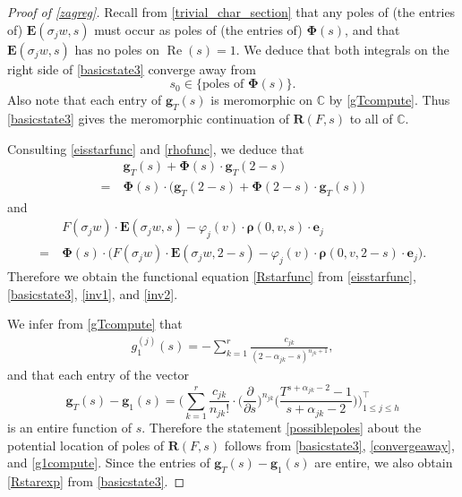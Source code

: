 \documentclass[12pt,reqno]{amsart}
\numberwithin{equation}{section}
\renewcommand{\Re}{\operatorname{Re}}
\begin{document}
\begin{proof}[Proof of \cref{zagreg}]
Recall from \cref{trivial_char_section} that any poles of (the entries of) $\boldsymbol{E}(\sigma_{j}w,s)$ must occur as poles of (the entries of) $\boldsymbol{\Phi}(s)$, and that $\boldsymbol{E}(\sigma_{j}w,s)$ has no poles on $\Re(s)=1$. We deduce that both integrals on the right side of \eqref{basicstate3} converge away from
\begin{equation}\label{convergeaway}
    s_0 \in \big\{\text{poles of } \boldsymbol{\Phi}(s)\big\}.
\end{equation} 
Also note that each entry of $\boldsymbol{g}_{T}(s)$ is meromorphic on $\mathbb{C}$ by  \eqref{gTcompute}. Thus \eqref{basicstate3} gives the meromorphic continuation of $\boldsymbol{R}(F,s)$ to all of $\mathbb{C}$.

Consulting \eqref{eisstarfunc} and \eqref{rhofunc}, we deduce that 
\begin{equation}\label{inv1}
\begin{aligned} 
    & \boldsymbol{g}_T(s)+ \boldsymbol{\Phi}(s) \cdot \boldsymbol{g}_T(2-s)   \\ 
    = \ & \boldsymbol{\Phi}(s) \cdot  \Big( \boldsymbol{g}_T(2-s) + \boldsymbol{\Phi}(2-s) \cdot \boldsymbol{g}_T(s) \Big)
\end{aligned}
\end{equation}
and 
\begin{equation}\label{inv2}
\begin{aligned} 
    & F(\sigma_{j} w) \cdot \boldsymbol{E}(\sigma_{j}w,s)-\varphi_{j}(v) \cdot \boldsymbol{\rho}(0,v,s) \cdot \boldsymbol{e}_j \\
    = \ & \boldsymbol{\Phi}(s) \cdot \Big(F(\sigma_{j} w) \cdot \boldsymbol{E}(\sigma_{j}w,2-s) -\varphi_{j}(v) \cdot \boldsymbol{\rho}(0,v,2-s) \cdot \boldsymbol{e}_j \Big).
\end{aligned}
\end{equation}
Therefore we obtain the functional equation \eqref{Rstarfunc} from \eqref{eisstarfunc}, \eqref{basicstate3}, \eqref{inv1}, and \eqref{inv2}.

We infer from \eqref{gTcompute} that 
\begin{align} \label{g1compute}
    g^{(j)}_1(s)=-\sum_{k=1}^{r} \frac{c_{jk}}{(2-\alpha_{jk}-s)^{n_{jk}+1}},
\end{align}
and that each entry of the vector
\begin{equation} \label{entire}
    \boldsymbol{g}_{T}(s)-\boldsymbol{g}_{1}(s)= \Big( \sum_{k=1}^{r} \frac{c_{jk}}{n_{jk} !} \cdot \Big(\frac{\partial}{\partial s}\Big)^{n_{jk}} \Big( \frac{T^{s+\alpha_{jk}-2}-1}{s+\alpha_{jk}-2} \Big) \Big)^{\top}_{1 \leq j \leq h}
\end{equation}
is an entire function of $s$. Therefore the statement \eqref{possiblepoles} about the potential location of poles of $\boldsymbol{R}(F, s)$ follows from \eqref{basicstate3}, \eqref{convergeaway}, and \eqref{g1compute}.
Since the entries of $\boldsymbol{g}_T(s)-\boldsymbol{g}_1(s)$ are entire, we also obtain \eqref{Rstarexp} from \eqref{basicstate3}. 


\end{proof}
\end{document}

